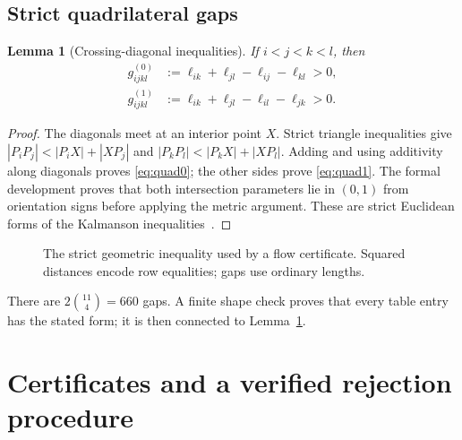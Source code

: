 \documentclass[11pt,a4paper]{article}
\newtheorem{lemma}[theorem]{Lemma}
\theoremstyle{definition}
\begin{document}
\subsection{Strict quadrilateral gaps}
\begin{lemma}[Crossing-diagonal inequalities]\label{lem:quad}
If $i<j<k<l$, then
\begin{align}
 g^{(0)}_{ijkl}&:=\ell_{ik}+\ell_{jl}-\ell_{ij}-\ell_{kl}>0,\label{eq:quad0}\\
 g^{(1)}_{ijkl}&:=\ell_{ik}+\ell_{jl}-\ell_{il}-\ell_{jk}>0.\label{eq:quad1}
\end{align}
\end{lemma}
\begin{proof}
The diagonals meet at an interior point $X$. Strict triangle inequalities give $|P_iP_j|<|P_iX|+|XP_j|$ and $|P_kP_l|<|P_kX|+|XP_l|$. Adding and using additivity along diagonals proves \eqref{eq:quad0}; the other sides prove \eqref{eq:quad1}. The formal development proves that both intersection parameters lie in $(0,1)$ from orientation signs before applying the metric argument. These are strict Euclidean forms of the Kalmanson inequalities~\cite{Kalmanson1975}.
\end{proof}
\begin{figure}[tb]
\centering
{}
\caption{The strict geometric inequality used by a flow certificate. Squared distances encode row equalities; gaps use ordinary lengths.}\label{fig:quad}

\end{figure}
There are $2\binom{11}{4}=660$ gaps. A finite shape check proves that every table entry has the stated form; it is then connected to Lemma~\ref{lem:quad}.

\section{Certificates and a verified rejection procedure}\label{sec:checker}
\end{document}
